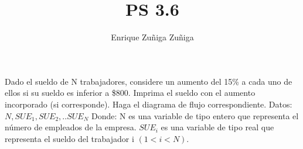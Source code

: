 \documentclass[11pt]{amsart}
\title{PS 3.6}
\author{Enrique Zuñiga Zuñiga}
\begin{document}
\maketitle
\noindent Dado el sueldo de N trabajadores, considere un aumento del 15\% a cada uno de ellos si su sueldo es inferior a \$800. Imprima el sueldo con el aumento incorporado (si corresponde). Haga el diagrama de flujo correspondiente.\newline
Datos:$ N, SUE_1, SUE_2, .. SUE_N$\newline
Donde:\newline
N es una variable de tipo entero que representa el número de empleados de la empresa.\newline
$SUE_i$ es una variable de tipo real que representa el sueldo del trabajador i $(1 < i < N)$.\newline
\end{document}

